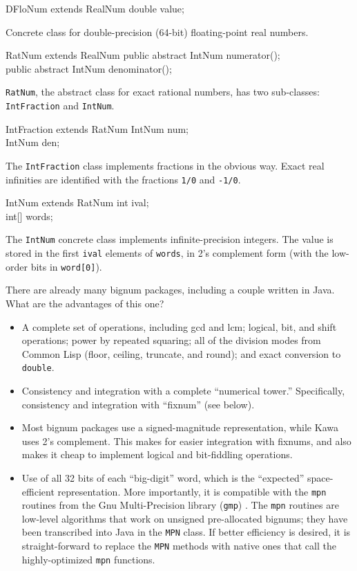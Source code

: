 \documentclass[twocolumn]{article}
\begin{document}
\begin{Class}{DFloNum}{ extends RealNum}
double value;\\
\end{Class}
Concrete class for double-precision (64-bit) floating-point real numbers.

\begin{Class}{RatNum}{ extends RealNum}
public abstract IntNum numerator();\\
public abstract IntNum denominator();\\
\end{Class}

{\tt RatNum}, the abstract class for exact rational numbers,
has two sub-classes:  {\tt IntFraction} and {\tt IntNum}.

\begin{Class}{IntFraction}{ extends RatNum}
IntNum num;\\
IntNum den;\\
\end{Class}

The {\tt IntFraction} class implements fractions in the obvious way.
Exact real infinities are identified with the
fractions {\tt 1/0} and {\tt -1/0}.

\begin{Class}{IntNum}{ extends RatNum}
int ival;\\
int[] words;\\
\end{Class}

The {\tt IntNum} concrete class implements infinite-precision integers.
The value is stored in the first {\tt ival} elements of {\tt words},
in 2's complement form (with the low-order bits in \verb|word[0]|).

There are already many bignum packages, including a couple written
in Java.  What are the advantages of this one?
\begin{itemize}
\item A complete set of operations, including gcd and lcm;  logical, bit,
and shift operations; power by repeated squaring; all of the
division modes from Common Lisp (floor, ceiling, truncate, and round);
and exact conversion to {\tt double}.
\item Consistency and integration with a complete ``numerical tower.''
Specifically, consistency and integration with ``fixnum'' (see below).
\item Most bignum packages use a signed-magnitude representation,
while Kawa uses 2's complement.  This makes for easier integration
with fixnums, and also makes it cheap to implement
logical and bit-fiddling operations.
\item Use of all 32 bits of each ``big-digit'' word, which
is the ``expected'' space-efficient representation.
More importantly, it is compatible with the {\tt mpn} routines
from the Gnu Multi-Precision library ({\tt gmp}) \cite{gmp}.
The {\tt mpn} routines are low-level algorithms that work
on unsigned pre-allocated bignums;  they have been transcribed
into Java in the {\tt MPN} class.  If better efficiency is
desired, it is straight-forward to replace the {\tt MPN}
methods with native ones that call the highly-optimized {\tt mpn} functions.
\end{itemize}
\end{document}
